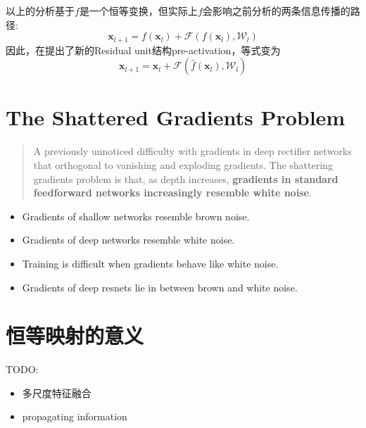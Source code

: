 以上的分析基于$f$是一个恒等变换，但实际上$f$会影响之前分析的两条信息传播的路径:
\begin{equation}
    \mathbf{x}_{l+1} = f(\mathbf{x}_l) + \mathcal{F}(f(\mathbf{x}_l), \mathcal{W}_l)
\end{equation}
因此，在\cite{He2016identity}提出了新的Residual unit结构pre-activation，等式变为
\begin{equation}
    \mathbf{x}_{l+1} = \mathbf{x}_l + \mathcal{F}(\hat f(\mathbf{x}_l), \mathcal{W}_l)
\end{equation}

\section{The Shattered Gradients Problem}
\begin{quotation}
    A previously unnoticed difficulty with gradients in deep rectifier networks that orthogonal
    to vanishing and exploding gradients. The shattering gradients problem is that, as depth increases,
    \textbf{gradients in standard feedforward networks increasingly resemble white noise}\cite{Balduzzi2017}.
\end{quotation}
\begin{itemize}
    \item Gradients of shallow networks resemble brown noise.
    \item Gradients of deep networks resemble white noise.
    \item Training is difficult when gradients behave like white noise.
    \item Gradients of deep resnets lie in between brown and white noise.
\end{itemize}


\section{恒等映射的意义}
TODO:
\begin{itemize}
    \item 多尺度特征融合
    \item propagating information
\end{itemize}